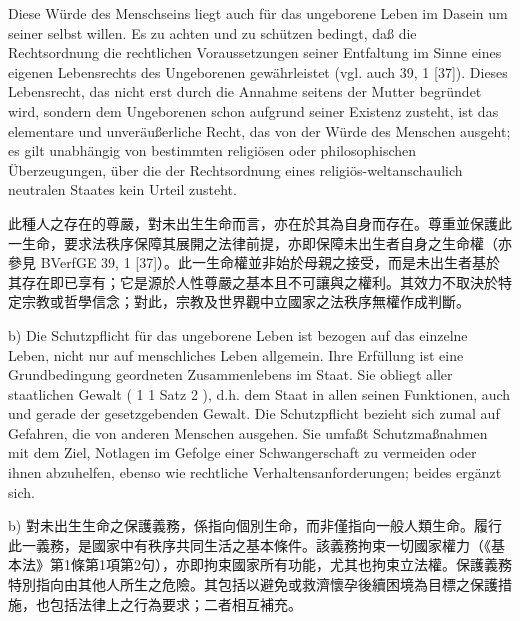\documentclass[12pt]{article}
\begin{document}
\begin{sourcepara}[title={原文D.38}]
Diese Würde des Menschseins liegt auch für das ungeborene Leben im Dasein um seiner selbst willen. Es zu achten und zu schützen bedingt, daß die Rechtsordnung die rechtlichen Voraussetzungen seiner Entfaltung im Sinne eines eigenen Lebensrechts des Ungeborenen gewährleistet (vgl. auch \abbrBVerfGE{} 39, 1 [37]). Dieses Lebensrecht, das nicht erst durch die Annahme seitens der Mutter begründet wird, sondern dem Ungeborenen schon aufgrund seiner Existenz zusteht, ist das elementare und unveräußerliche Recht, das von der Würde des Menschen ausgeht; es gilt unabhängig von bestimmten religiösen oder philosophischen Überzeugungen, über die der Rechtsordnung eines religiös-weltanschaulich neutralen Staates kein Urteil zusteht.
\end{sourcepara}
\begin{transpara}
此種人之存在的尊嚴，對未出生生命而言，亦在於其為自身而存在。尊重並保護此一生命，要求法秩序保障其展開之法律前提，亦即保障未出生者自身之生命權（亦參見 BVerfGE 39, 1 [37]）。此一生命權並非始於母親之接受，而是未出生者基於其存在即已享有；它是源於人性尊嚴之基本且不可讓與之權利。其效力不取決於特定宗教或哲學信念；對此，宗教及世界觀中立國家之法秩序無權作成判斷。
\end{transpara}

\begin{sourcepara}[title={原文D.39}]
b) Die Schutzpflicht für das ungeborene Leben ist bezogen auf das einzelne Leben, nicht nur auf menschliches Leben allgemein. Ihre Erfüllung ist eine Grundbedingung geordneten Zusammenlebens im Staat. Sie obliegt aller staatlichen Gewalt (\abbrArt{} 1 \abbrAbs{} 1 Satz 2 \abbrGG{}\ggfnArtOneOneTwoDE{}), d.h. dem Staat in allen seinen Funktionen, auch und gerade der gesetzgebenden Gewalt. Die Schutzpflicht bezieht sich zumal auf Gefahren, die von anderen Menschen ausgehen. Sie umfaßt Schutzmaßnahmen mit dem Ziel, Notlagen im Gefolge einer Schwangerschaft zu vermeiden oder ihnen abzuhelfen, ebenso wie rechtliche Verhaltensanforderungen; beides ergänzt sich.
\end{sourcepara}
\begin{transpara}
b) 對未出生生命之保護義務，係指向個別生命，而非僅指向一般人類生命。履行此一義務，是國家中有秩序共同生活之基本條件。該義務拘束一切國家權力（《基本法》第1條第1項第2句\ggfnArtOneOneTwoZH{}），亦即拘束國家所有功能，尤其也拘束立法權。保護義務特別指向由其他人所生之危險。其包括以避免或救濟懷孕後續困境為目標之保護措施，也包括法律上之行為要求；二者相互補充。
\end{transpara}
\end{document}
